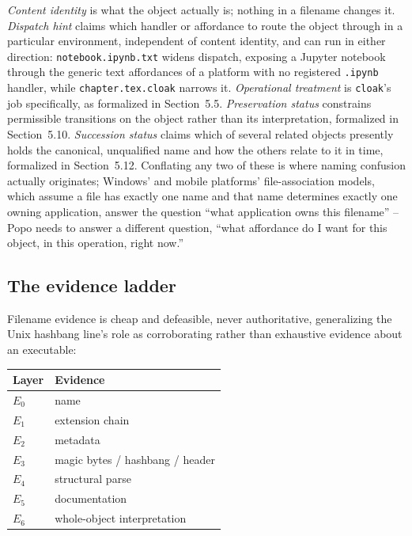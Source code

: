 \documentclass[11pt]{article}
\begin{document}
\emph{Content identity} is what the object actually is; nothing in a filename changes it. \emph{Dispatch hint} claims which handler or affordance to route the object through in a particular environment, independent of content identity, and can run in either direction: \texttt{notebook.ipynb.txt} widens dispatch, exposing a Jupyter notebook through the generic text affordances of a platform with no registered \texttt{.ipynb} handler, while \texttt{chapter.tex.cloak} narrows it. \emph{Operational treatment} is \texttt{cloak}'s job specifically, as formalized in Section~5.5. \emph{Preservation status} constrains permissible transitions on the object rather than its interpretation, formalized in Section~5.10. \emph{Succession status} claims which of several related objects presently holds the canonical, unqualified name and how the others relate to it in time, formalized in Section~5.12. Conflating any two of these is where naming confusion actually originates; Windows' and mobile platforms' file-association models, which assume a file has exactly one name and that name determines exactly one owning application, answer the question ``what application owns this filename'' -- Popo needs to answer a different question, ``what affordance do I want for this object, in this operation, right now.''

\subsection{The evidence ladder}

Filename evidence is cheap and defeasible, never authoritative, generalizing the Unix hashbang line's role as corroborating rather than exhaustive evidence about an executable:

\begin{center}
\begin{tabular}{@{}ll@{}}
\toprule
Layer & Evidence \\
\midrule
$E_0$ & name \\
$E_1$ & extension chain \\
$E_2$ & metadata \\
$E_3$ & magic bytes / hashbang / header \\
$E_4$ & structural parse \\
$E_5$ & documentation \\
$E_6$ & whole-object interpretation \\
\bottomrule
\end{tabular}
\end{center}
\end{document}
